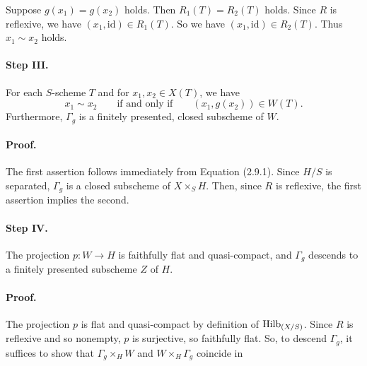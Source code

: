 Suppose $g(x_1)=g(x_2)$ holds. Then $R_1(T)=R_2(T)$ holds. Since $R$ is
reflexive, we have $(x_1,\mathrm{id})\in R_1(T)$. So we have
$(x_1,\mathrm{id})\in R_2(T)$. Thus $x_1\sim x_2$ holds.

\paragraph{Step III.}
For each $S$-scheme $T$ and for $x_1,x_2\in X(T)$, we have
\[
x_1\sim x_2\qquad\text{if and only if}\qquad
(x_1,g(x_2))\in W(T).
\]
Furthermore, $\Gamma_g$ is a finitely presented, closed subscheme of $W$.

\paragraph{Proof.}
The first assertion follows immediately from Equation (2.9.1). Since $H/S$
is separated, $\Gamma_g$ is a closed subscheme of $X\times_S H$. Then,
since $R$ is reflexive, the first assertion implies the second.

\paragraph{Step IV.}
The projection $p:W\to H$ is faithfully flat and quasi-compact, and
$\Gamma_g$ descends to a finitely presented subscheme $Z$ of $H$.

\paragraph{Proof.}
The projection $p$ is flat and quasi-compact by definition of
$\operatorname{Hilb}_{(X/S)}$. Since $R$ is reflexive and so nonempty, $p$ is surjective,
so faithfully flat. So, to descend $\Gamma_g$, it suffices to show that
$\Gamma_g\times_H W$ and $W\times_H\Gamma_g$ coincide in
